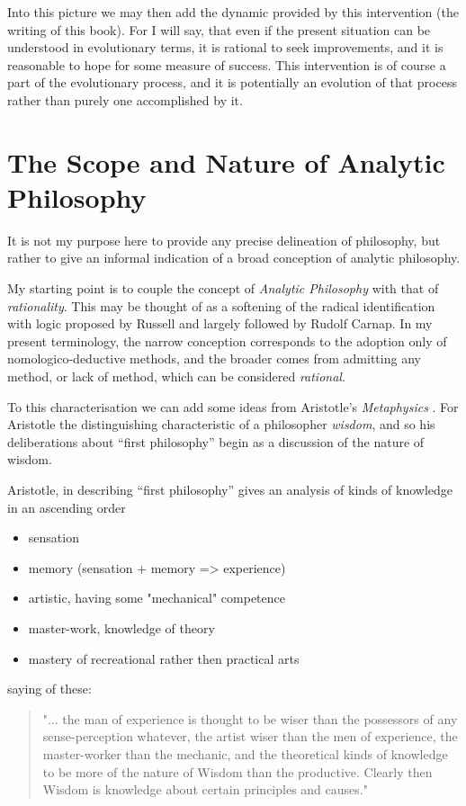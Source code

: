 Into this picture we may then add the dynamic provided by this intervention (the writing of this book).
For I will say, that even if the present situation can be understood in evolutionary terms, it is rational to seek improvements, and it is reasonable to hope for some measure of success.
This intervention is of course a part of the evolutionary process, and it is potentially an evolution of that process rather than purely one accomplished by it.

\section{The Scope and Nature of Analytic Philosophy}

It is not my purpose here to provide any precise delineation of philosophy, but rather to give an informal indication of a broad conception of analytic philosophy.

My starting point is to couple the concept of \emph{Analytic Philosophy} with that of \emph{rationality}.
This may be thought of as a softening of the radical identification with logic proposed by Russell and largely followed by Rudolf Carnap.
In my present terminology, the narrow conception corresponds to the adoption only of nomologico-deductive methods, and the broader comes from admitting any method, or lack of method, which can be considered \emph{rational}.

To this characterisation we can add some ideas from Aristotle's \emph{Metaphysics} \cite{aristotleMETAP}.
For Aristotle the distinguishing characteristic of a philosopher \emph{wisdom}, and so his deliberations about ``first philosophy'' begin as a discussion of the nature of wisdom.

Aristotle, in describing ``first philosophy'' gives an analysis of kinds of knowledge in an ascending order

\begin{itemize}
\item sensation
\item memory (sensation + memory => experience)
\item artistic, having some "mechanical" competence
\item master-work, knowledge of theory
\item mastery of recreational rather then practical arts
\end{itemize}

saying of these:

\begin{quote}
"... the man of experience is thought to be wiser than the possessors of any sense-perception whatever, the artist wiser than the men of experience, the master-worker than the mechanic, and the theoretical kinds of knowledge to be more of the nature of Wisdom than the productive.
Clearly then Wisdom is knowledge about certain principles and causes." 
\end{quote}

